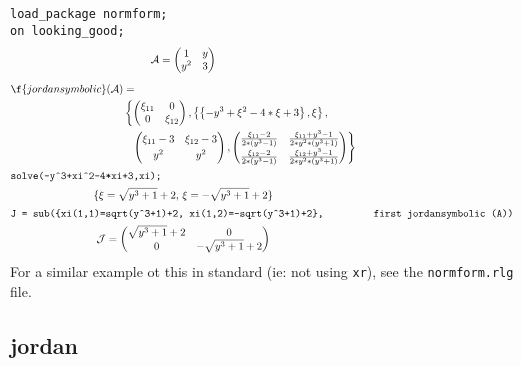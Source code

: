 \begin{description}
\texttt{load\_package normform;}\\
\texttt{on looking\_good;} 
\begin{gather*}
\mathcal{A} = \begin{pmatrix} 1 & y \\ y^2 & 3  \end{pmatrix}  \\[2mm]
\begin{split}
\f{jordansymbolic}(\mathcal{A}) &= \\ 
 & \left\{
     \begin{pmatrix} \xi_{11} & 0 \\ 0 & \xi_{12} \end{pmatrix} ,
     \left\{ \left\{ -y^3+\xi^2-4*\xi+3 \right\}, \xi \right\}, \right. \\
 & \hspace{0.1in} \left.
       \begin{pmatrix} \xi_{11} -3 & \xi_{12} -3 \\[1mm] y^2 & y^2 \end{pmatrix},
       \begin{pmatrix} \frac{\xi_{11} -2} {2*(y^3-1)}
                 & \frac{\xi_{11} + y^3 -1}{2*y^2*(y^3+1)} \\[1mm]
                \frac{\xi_{12} -2}{2*(y^3-1)}
                 & \frac{\xi_{12}+y^3-1}{2*y^2*(y^3+1)}
       \end{pmatrix}
  \right\} 
\end{split} \\
\intertext{\texttt{solve(-y\^{}3+xi\^{}2-4*xi+3,xi);}}
\{ \xi = \sqrt{y^3+1} + 2,\, \xi = -\sqrt{y^3+1}+2 \} \\
\intertext{\texttt{J = sub(\{xi(1,1)=sqrt(y\^{}3+1)+2, xi(1,2)=-sqrt(y\^{}3+1)+2\},
   \mbox{}\ \ \ \ \ \ \ \ first  jordansymbolic (A))}}
%
\mathcal{J} = \begin{pmatrix} \sqrt{y^3+1} + 2 & 0 \\ 0 & 
-\sqrt{y^3+1} + 2 \end{pmatrix}
\end{gather*}
For a similar example ot this in standard {\REDUCE} (ie: not using 
\texttt{xr}), see the \texttt{normform.rlg} file.
\end{description}

\subsection{jordan}

